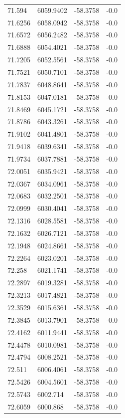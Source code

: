 \begin{table}[H]
\begin{tabular}{llll}
71.594 & 6059.9402 & -58.3758 & -0.0 \\
71.6256 & 6058.0942 & -58.3758 & -0.0 \\
71.6572 & 6056.2482 & -58.3758 & -0.0 \\
71.6888 & 6054.4021 & -58.3758 & -0.0 \\
71.7205 & 6052.5561 & -58.3758 & -0.0 \\
71.7521 & 6050.7101 & -58.3758 & -0.0 \\
71.7837 & 6048.8641 & -58.3758 & -0.0 \\
71.8153 & 6047.0181 & -58.3758 & -0.0 \\
71.8469 & 6045.1721 & -58.3758 & -0.0 \\
71.8786 & 6043.3261 & -58.3758 & -0.0 \\
71.9102 & 6041.4801 & -58.3758 & -0.0 \\
71.9418 & 6039.6341 & -58.3758 & -0.0 \\
71.9734 & 6037.7881 & -58.3758 & -0.0 \\
72.0051 & 6035.9421 & -58.3758 & -0.0 \\
72.0367 & 6034.0961 & -58.3758 & -0.0 \\
72.0683 & 6032.2501 & -58.3758 & -0.0 \\
72.0999 & 6030.4041 & -58.3758 & -0.0 \\
72.1316 & 6028.5581 & -58.3758 & -0.0 \\
72.1632 & 6026.7121 & -58.3758 & -0.0 \\
72.1948 & 6024.8661 & -58.3758 & -0.0 \\
72.2264 & 6023.0201 & -58.3758 & -0.0 \\
72.258 & 6021.1741 & -58.3758 & -0.0 \\
72.2897 & 6019.3281 & -58.3758 & -0.0 \\
72.3213 & 6017.4821 & -58.3758 & -0.0 \\
72.3529 & 6015.6361 & -58.3758 & -0.0 \\
72.3845 & 6013.7901 & -58.3758 & -0.0 \\
72.4162 & 6011.9441 & -58.3758 & -0.0 \\
72.4478 & 6010.0981 & -58.3758 & -0.0 \\
72.4794 & 6008.2521 & -58.3758 & -0.0 \\
72.511 & 6006.4061 & -58.3758 & -0.0 \\
72.5426 & 6004.5601 & -58.3758 & -0.0 \\
72.5743 & 6002.714 & -58.3758 & -0.0 \\
72.6059 & 6000.868 & -58.3758 & -0.0 \\

\end{tabular}
\end{table}
